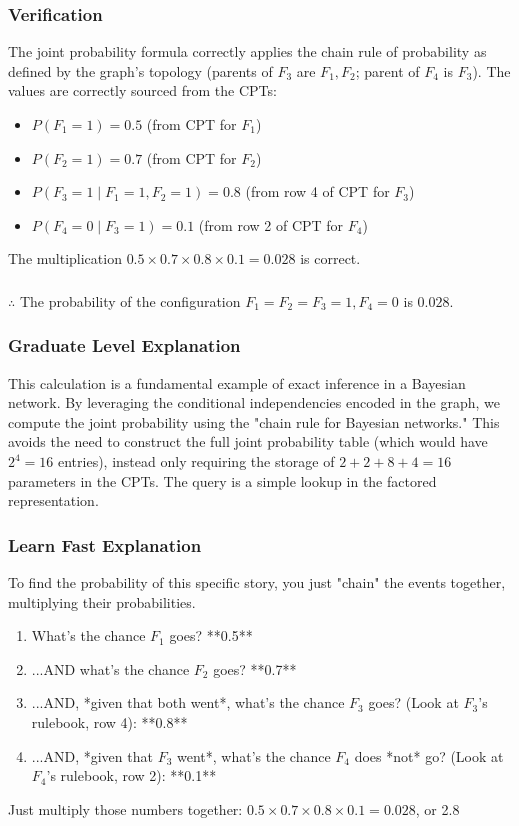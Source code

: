 \documentclass{article}
\begin{document}
\subsubsection*{Verification}
The joint probability formula correctly applies the chain rule of probability as defined by the graph's topology (parents of $F_3$ are $F_1, F_2$; parent of $F_4$ is $F_3$). The values are correctly sourced from the CPTs:
\begin{itemize}
    \item $P(F_1=1) = 0.5$ (from CPT for $F_1$)
    \item $P(F_2=1) = 0.7$ (from CPT for $F_2$)
    \item $P(F_3=1 \mid F_1=1, F_2=1) = 0.8$ (from row 4 of CPT for $F_3$)
    \item $P(F_4=0 \mid F_3=1) = 0.1$ (from row 2 of CPT for $F_4$)
\end{itemize}
The multiplication $0.5 \times 0.7 \times 0.8 \times 0.1 = 0.028$ is correct.

\subsubsection*{\normalfont}{$\therefore$ The probability of the configuration $F_1 = F_2 = F_3 = 1, F_4 = 0$ is $0.028$.}

\subsubsection*{Graduate Level Explanation}
This calculation is a fundamental example of exact inference in a Bayesian network. By leveraging the conditional independencies encoded in the graph, we compute the joint probability using the "chain rule for Bayesian networks." This avoids the need to construct the full joint probability table (which would have $2^4 = 16$ entries), instead only requiring the storage of $2 + 2 + 8 + 4 = 16$ parameters in the CPTs. The query is a simple lookup in the factored representation.

\subsubsection*{Learn Fast Explanation}
To find the probability of this specific story, you just "chain" the events together, multiplying their probabilities.
\begin{enumerate}
    \item What's the chance $F_1$ goes? **0.5**
    \item ...AND what's the chance $F_2$ goes? **0.7**
    \item ...AND, *given that both went*, what's the chance $F_3$ goes? (Look at $F_3$'s rulebook, row 4): **0.8**
    \item ...AND, *given that $F_3$ went*, what's the chance $F_4$ does *not* go? (Look at $F_4$'s rulebook, row 2): **0.1**
\end{enumerate}
Just multiply those numbers together: $0.5 \times 0.7 \times 0.8 \times 0.1 = 0.028$, or 2.8%
\end{document}
